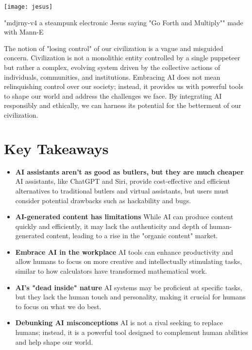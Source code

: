 \begin{pdf}
\begin{marginfigure}[-5.5cm]
        \texttt{[image: jesus]}
        \caption{"mdjrny-v4 a steampunk electronic Jesus saying "Go Forth and Multiply"" made with Mann-E}
\end{marginfigure}
\end{pdf}

The notion of "losing control" of our civilization is a vague and misguided concern. Civilization is not a monolithic entity controlled by a single puppeteer but rather a complex, evolving system driven by the collective actions of individuals, communities, and institutions. Embracing AI does not mean relinquishing control over our society; instead, it provides us with powerful tools to shape our world and address the challenges we face. By integrating AI responsibly and ethically, we can harness its potential for the betterment of our civilization.

\section{Key Takeaways}

\begin{itemize}
\item \textbf{AI assistants aren't as good as butlers, but they are much cheaper} AI assistants, like ChatGPT and Siri, provide cost-effective and efficient alternatives to traditional butlers and virtual assistants, but users must consider potential drawbacks such as hackability and bugs.
\item \textbf{AI-generated content has limitations} While AI can produce content quickly and efficiently, it may lack the authenticity and depth of human-generated content, leading to a rise in the "organic content" market.
\item \textbf{Embrace AI in the workplace} AI tools can enhance productivity and allow humans to focus on more creative and intellectually stimulating tasks, similar to how calculators have transformed mathematical work.
\item \textbf{AI's "dead inside" nature} AI systems may be proficient at specific tasks, but they lack the human touch and personality, making it crucial for humans to focus on what we do best.
\item \textbf{Debunking AI misconceptions} AI is not a rival seeking to replace humans; instead, it is a powerful tool designed to complement human abilities and help shape our world.
\end{itemize}
